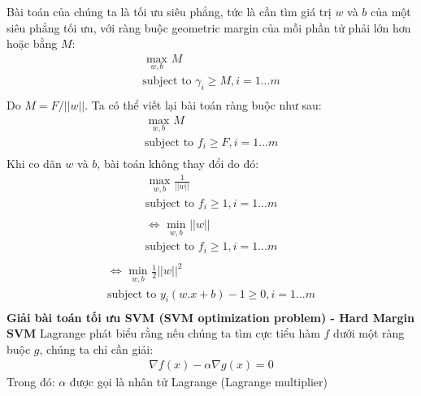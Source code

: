 \documentclass{article}
\begin{document}
	Bài toán của chúng ta là tối ưu siêu phẳng, tức là cần tìm giá trị $w$ và $b$ của một siêu phẳng tối ưu, với ràng buộc geometric margin của mỗi phần tử phải lớn hơn hoặc bằng $M$:
	\begin{gather*}
		\underset{w, b}{\text{ max }}M \\
		\text{subject to } \gamma_i \geq M, i = 1...m \\
	\end{gather*}
	Do $M = F/||w||$. Ta có thể viết lại bài toán ràng buộc như sau:
	\begin{gather*}
		\underset{w, b}{\text{ max }}M \\
		\text{subject to } f_i \geq F, i = 1...m \\
	\end{gather*}
	Khi co dãn $w$ và $b$, bài toán không thay đổi do đó:
	\begin{gather*}
		\underset{w, b}{\text{ max }}\frac{1}{||w||} \\
		\text{subject to } f_i \geq 1, i = 1...m \\
	\end{gather*}
	\begin{gather*}
		\Leftrightarrow \underset{w, b}{\text{ min }}||w|| \\
		\text{subject to } f_i \geq 1, i = 1...m \\
	\end{gather*}
	\begin{gather*}
		\Leftrightarrow \underset{w, b}{\text{ min }}\frac{1}{2}||w||^2 \\
		\text{subject to } y_i(w.x+b) -1 \geq 0, i = 1...m \\
	\end{gather*}
	\textbf{Giải bài toán tối ưu SVM (SVM optimization problem) - Hard Margin SVM}\newline
	Lagrange phát biểu rằng nếu chúng ta tìm cực tiểu hàm $f$ dưới một ràng buộc $g$, chúng ta chỉ cần giải:
	\begin{gather*}
		\nabla f(x) - \alpha\nabla g(x) = 0
	\end{gather*}
	Trong đó: $\alpha$ được gọi là nhân tử Lagrange (Lagrange multiplier)
	
\end{document}

